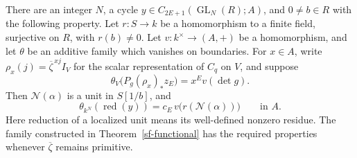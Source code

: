 \begin{theorem}\label{sa-class}
There are an integer \(N\), a cycle
\(y\in C_{2E+1}(\operatorname{GL}_N(R);A)\),
and \(0\ne b\in R\) with the following property.
Let \(r:S\to k\) be a homomorphism to a finite field,
surjective on \(R\), with \(r(b)\ne0\).
Let \(v:k^\times\to(A,+)\) be a homomorphism, and
let \(\theta\) be an additive family which vanishes
on boundaries.  For \(x\in A\), write
\(\rho_x(j)=\overline\zeta^{\,xj}I_V\) for the scalar
representation of \(C_q\) on \(V\), and suppose
\[
       \theta_V\bigl(P_g(\rho_x)_*z_E\bigr)
                             =x^E v(\det g).
\]
Then \(\mathcal N(\alpha)\) is a unit in \(S[1/b]\),
and
\[
       \theta_{k^N}(\operatorname{red}(y))
                       =c_E\,v\bigl(r(\mathcal N(\alpha))\bigr)
                        \qquad\text{in }A.
\]
Here reduction of a localized unit means its well-defined
nonzero residue.  The family constructed in
Theorem~\ref{sf-functional} has the required properties
whenever \(\overline\zeta\) remains primitive.
\end{theorem}
